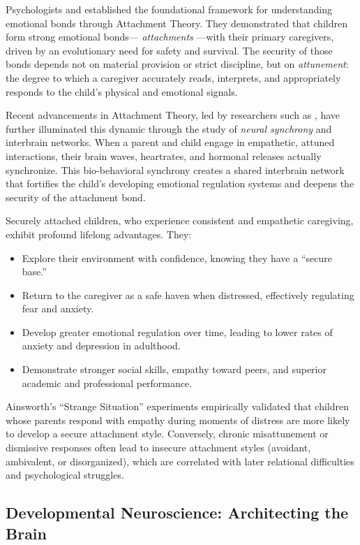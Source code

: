 Psychologists \citet{bowlby1969} and \citet{ainsworth1978} established the foundational framework for understanding emotional bonds through Attachment Theory. 
They demonstrated that children form strong emotional bonds--- \textit{attachments} ---with their primary caregivers, driven by an evolutionary need for safety and survival. 
The security of those bonds depends not on material provision or strict discipline, but on \textit{attunement}: the degree to which a caregiver accurately reads, interprets, and appropriately responds to the child's physical and emotional signals.

Recent advancements in Attachment Theory, led by researchers such as \citet{feldman2024}, have further illuminated this dynamic through the study of \textit{neural synchrony} and interbrain networks.
When a parent and child engage in empathetic, attuned interactions, their brain waves, heartrates, and hormonal releases actually synchronize. 
This bio-behavioral synchrony creates a shared interbrain network that fortifies the child's developing emotional regulation systems and deepens the security of the attachment bond.

Securely attached children, who experience consistent and empathetic caregiving,
exhibit profound lifelong advantages. 
They:
\begin{itemize}
  \item Explore their environment with confidence, knowing they have a ``secure base.''
  \item Return to the caregiver as a safe haven when distressed, effectively regulating fear and anxiety.
  \item Develop greater emotional regulation over time, leading to lower rates of anxiety and depression in adulthood.
  \item Demonstrate stronger social skills, empathy toward peers, and superior academic and professional performance.
\end{itemize}

Ainsworth's \citep{ainsworth1978} ``Strange Situation'' experiments empirically validated that children whose parents respond with empathy during moments of distress are more likely to develop a secure attachment style. 
Conversely, chronic misattunement or dismissive responses often lead to insecure attachment styles (avoidant, ambivalent, or disorganized), which are correlated with later relational difficulties and psychological struggles.

\subsection{Developmental Neuroscience: Architecting the Brain}

